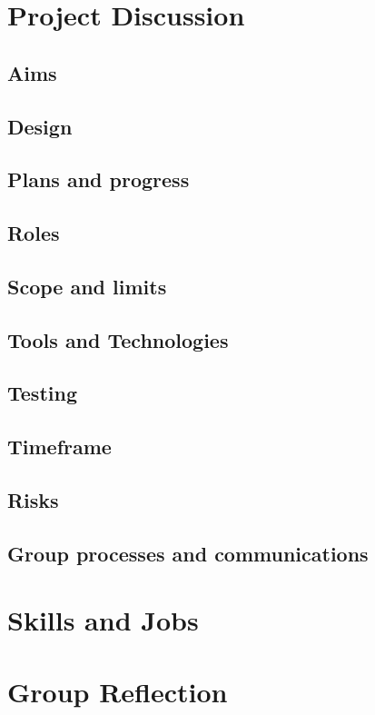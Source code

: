 \documentclass[a4paper,12pt]{extreport}
\begin{document}
\chapter*{Project Discussion}
	\section{Aims}
	\lipsum[1]
	\section{Design}
	\lipsum[1]
	\section{Plans and progress}
	\lipsum[1]
	\section{Roles}
	\lipsum[1]
	\section{Scope and limits}
	\lipsum[1]
	\section{Tools and Technologies}
	\lipsum[1]
	\section{Testing}
	\lipsum[1]
	\section{Timeframe}
	\lipsum[1]
	\section{Risks}
	\lipsum[1]
	\section{Group processes and communications}
	\lipsum[1]
\chapter*{Skills and Jobs}
	\lipsum[1]
\chapter*{Group Reflection}
	\lipsum[1]
\end{document}
